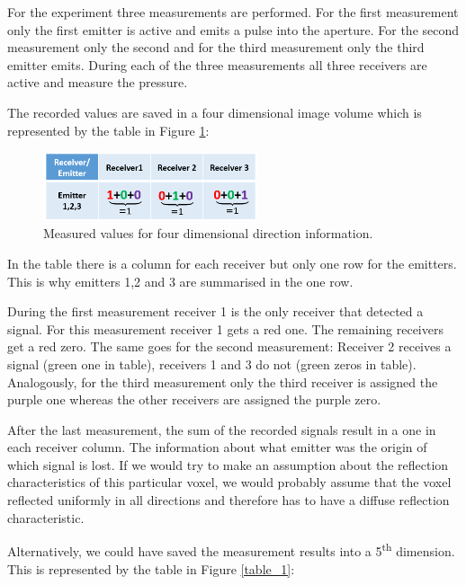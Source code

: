 For the experiment three measurements are performed. For the first measurement only the first emitter is active and emits a pulse into the aperture. For the second measurement only the second and for the third measurement only the third emitter emits. During each of the three measurements all three receivers are active and measure the pressure. 

The recorded values are saved in a four dimensional image volume which is represented by the table in Figure \ref{table_2}: 

\begin{figure}[H]
    \centering
    \includegraphics[width=0.56\textwidth]{Graphics/Diskussion/4D_not_enough_table_2.png}
    \caption{Measured values for four dimensional direction information.}
    \label{table_2}
\end{figure}

In the table there is a column for each receiver but only one row for the emitters. This is why emitters 1,2 and 3 are summarised in the one row.

During the first measurement receiver 1 is the only receiver that detected a signal. For this measurement receiver 1 gets a red one. The remaining receivers get a red zero. The same goes for the second measurement: Receiver 2 receives a signal (green one in table), receivers 1 and 3 do not (green zeros in table). Analogously, for the third measurement only the third receiver is assigned the purple one whereas the other receivers are assigned the purple zero.

\bigskip

After the last measurement, the sum of the recorded signals result in a one in each receiver column. The information about what emitter was the origin of which signal is lost. If we would try to make an assumption about the reflection characteristics of this particular voxel, we would probably assume that the voxel reflected uniformly in all directions and therefore has to have a diffuse reflection characteristic.

\bigskip

Alternatively, we could have saved the measurement results into a 5\textsuperscript{th} dimension. This is represented by the table in Figure \ref{table_1}:

